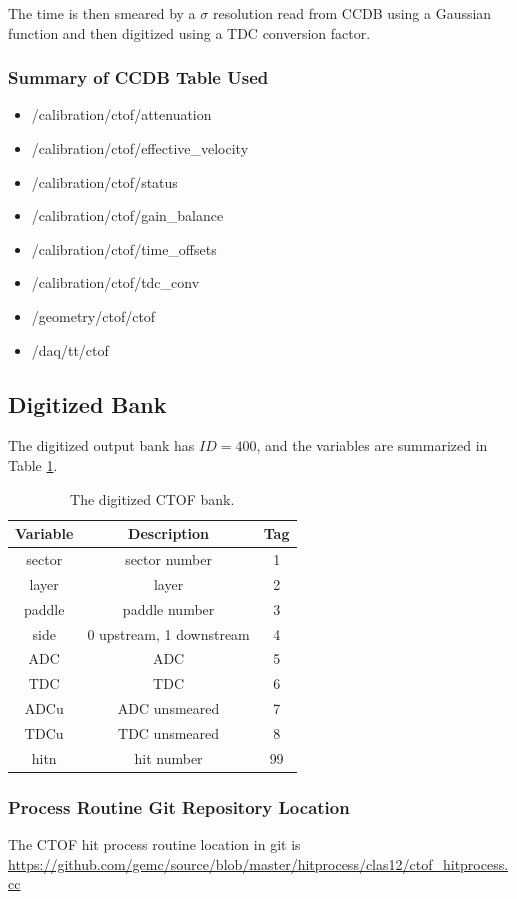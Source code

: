 The time is then smeared by a $\sigma$ resolution read from CCDB using a Gaussian function and then digitized using a TDC conversion factor.


\subsubsection{Summary of CCDB Table Used}

\begin{itemize}
	\item /calibration/ctof/attenuation
	\item /calibration/ctof/effective\_velocity
	\item /calibration/ctof/status
	\item /calibration/ctof/gain\_balance
	\item /calibration/ctof/time\_offsets
	\item /calibration/ctof/tdc\_conv
	\item /geometry/ctof/ctof
	\item /daq/tt/ctof
\end{itemize}


\subsection{Digitized Bank}

The digitized output bank has $ID=400$, and the variables are summarized in Table \ref{tab:ctofBank}.

\begin{table}[h]
	\begin{center}
		\begin{tabular}{| c | c | c |}
			\hline \hline
			Variable         & Description  & Tag  \\
			\hline
              sector  &                             sector number  &    1 \\
               layer  &                                     layer  &    2 \\
              paddle  &                             paddle number  &    3 \\
                side  &                  0 upstream, 1 downstream  &    4 \\
                 ADC  &                                       ADC  &    5 \\
                 TDC  &                                       TDC  &    6 \\
                ADCu  &                             ADC unsmeared  &    7 \\
                TDCu  &                             TDC unsmeared  &    8 \\
                hitn  &                                hit number  &   99 \\
			\hline \hline
		\end{tabular}
	\end{center}
	\caption{The digitized CTOF bank.}\label{tab:ctofBank}
\end{table}

\subsubsection{Process Routine Git Repository Location}
The CTOF hit process routine location in git is \url{https://github.com/gemc/source/blob/master/hitprocess/clas12/ctof_hitprocess.cc}
